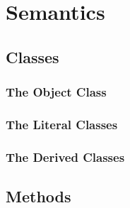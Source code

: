 \section{Semantics}
\subsection{Classes}

\subsubsection{The Object Class}
\subsubsection{The Literal Classes}
\subsubsection{The Derived Classes}
\subsection{Methods}